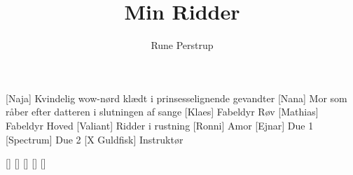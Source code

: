 \documentclass[a4paper,11pt]{article}
\title{Min Ridder}
\author{Rune Perstrup}
\begin{document}
 \maketitle

 \begin{roles}
   [Naja] Kvindelig wow-nørd klædt i prinsesselignende gevandter
   [Nana] Mor som råber efter datteren i slutningen af sange
   [Klaes] Fabeldyr Røv
   [Mathias] Fabeldyr Hoved
   [Valiant] Ridder i rustning
   [Ronni] Amor
   [Ejnar] Due 1
   [Spectrum] Due 2
   [X Guldfisk] Instruktør
 \end{roles}

 \begin{props}
   []
   []
   []
   []
   []
 \end{props}
\end{document}
